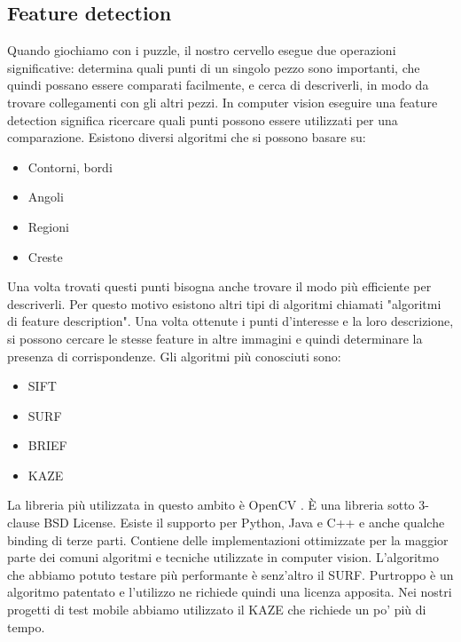 \documentclass[twoside]{supsistudent}
\begin{document}
\subsection{Feature detection}%
Quando giochiamo con i puzzle, il nostro cervello esegue due operazioni significative: determina quali punti di un singolo pezzo sono importanti, che quindi possano essere comparati facilmente, e cerca di descriverli, in modo da trovare collegamenti con gli altri pezzi. In computer vision eseguire una feature detection significa ricercare quali punti possono essere utilizzati per una comparazione. Esistono diversi algoritmi che si possono basare su: \begin{itemize}
\item Contorni, bordi
\item Angoli
\item Regioni
\item Creste
\end{itemize}
Una volta trovati questi punti bisogna anche trovare il modo più efficiente per descriverli. Per questo motivo esistono altri tipi di algoritmi chiamati "algoritmi di feature description".
Una volta ottenute i punti d'interesse e la loro descrizione, si possono cercare le stesse feature in altre immagini e quindi determinare la presenza di corrispondenze. 
Gli algoritmi più conosciuti sono:
\begin{itemize}
\item SIFT
\item SURF
\item BRIEF
\item KAZE
\end{itemize}
La libreria più utilizzata in questo ambito è OpenCV \cite{openCv}. È una libreria sotto 3-clause BSD License. Esiste il supporto per Python, Java e C++ e anche qualche binding di terze parti. Contiene delle implementazioni ottimizzate per la maggior parte dei comuni algoritmi e tecniche utilizzate in computer vision.
L'algoritmo che abbiamo potuto testare più performante è senz'altro il SURF\cite{surf}. Purtroppo è un algoritmo patentato e l'utilizzo ne richiede quindi una licenza apposita. Nei nostri progetti di test mobile abbiamo utilizzato il KAZE\cite{kaze} che richiede un po' più di tempo.
\end{document}
